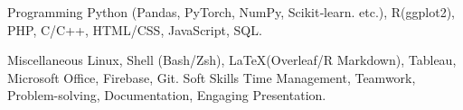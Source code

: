 

\begin{cvskills}

  \cvskill
    {Programming} %
    {Python (Pandas, PyTorch, NumPy, Scikit‑learn. etc.), R(ggplot2), PHP, C/C++, HTML/CSS, JavaScript, SQL.} %

  \cvskill
    {Miscellaneous} %
    {Linux, Shell (Bash/Zsh), \LaTeX (Overleaf/R Markdown), Tableau, Microsoft Office, Firebase, Git.} %
  \cvskill
    {Soft Skills} %
    {Time Management, Teamwork, Problem-solving, Documentation, Engaging Presentation.} %

\end{cvskills}
